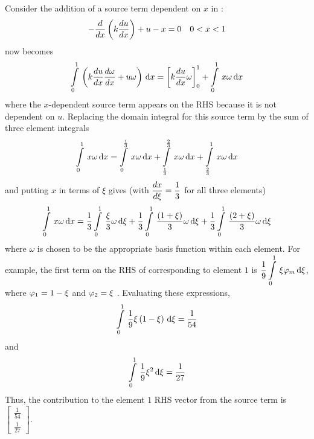 Consider the addition of a source term dependent on $x$ in 
:
\begin{equation*}
    - \dfrac{ d  }{d x} \left( k \dfrac{ d u}{d x}  \right)+u-x=0 \quad 0<x<1
\end{equation*}    
 now becomes
\begin{equation}
  \gint{0}{1}{\pbrac{k\dby{u}{x}\dby{\omega}{x} + u\omega}}{x} 
    = \inteval{k\dby{u}{x}\omega}{0}{1} +\gint{0}{1}{x\omega}{x}        
  \label{eqn:source_term_dep}
\end{equation}
where the $x$-dependent source term appears on the RHS because it is not 
dependent on $u$. Replacing the domain integral for this source term by the
sum of three element integrals
\begin{equation*}
  \gint{0}{1}{x\omega}{x}=\gint{0}{\frac13}{x\omega}{x} 
   + \gint{\frac13}{\frac23}{x\omega}{x} + \gint{\frac23}{1}{x\omega}{x}
\end{equation*}
and putting $x$ in terms of $\xi$ gives (with $ \dfrac{ d x}{d \xi} =\dfrac13 $ 
for all three elements)
\begin{equation}
  \gint{0}{1}{x\omega}{x}=\dfrac13\gint{0}{1}{\dfrac{\xi}{3}\omega}{\xi}
    + \dfrac13\gint{0}{1}{\dfrac{\pbrac{1+\xi}}{3}\omega}{\xi} +
    \dfrac13\gint{0}{1}{\dfrac{\pbrac{2+\xi}}{3}\omega}{\xi}
  \label{eqn:x-d.s.t.}
\end{equation}
where $\omega$ is chosen to be the appropriate basis function within each element. 
For example, the first term on the RHS of  corresponding to 
element $1$ is $\dfrac{1}{9}\gint{0}{1}{\xi\lbfnsymb{m}}{\xi}$,
where $ \varphi_{1} =1 -\xi$ and $ \varphi_{2} =\xi$ . Evaluating these expressions, 
\begin{equation*}
  \gint{0}{1}{\dfrac{1}{9}\xi\pbrac{1-\xi}}{\xi} = \dfrac{1}{54}
\end{equation*}
and
\begin{equation*}
  \gint{0}{1}{\dfrac{1}{9} \xi^{2}}{\xi} = \dfrac{1}{27}
\end{equation*}
Thus, the contribution to the element $1$ RHS vector from the source term is
$\begin{bmatrix}
  \frac{1}{54} \\
  \frac{1}{27}
\end{bmatrix}$.

